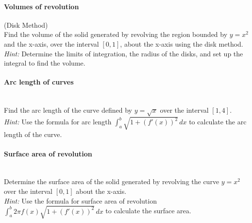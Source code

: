 \documentclass[]{article}
\begin{document}
	\paragraph{Volumes of revolution} (Disk Method)\\
	Find the volume of the solid generated by revolving the region bounded by \(y = x^2\) and the x-axis, over the interval \([0, 1]\), about the x-axis using the disk method.\\
	\textit{Hint:} Determine the limits of integration, the radius of the disks, and set up the integral to find the volume.
	
	\paragraph{Arc length of curves}\mbox{}\\
	Find the arc length of the curve defined by \(y = \sqrt{x}\) over the interval \([1, 4]\).\\
	\textit{Hint:} Use the formula for arc length \(\int_a^b \sqrt{1 + (f'(x))^2} \, dx\) to calculate the arc length of the curve.
	
	\paragraph{Surface area of revolution}\mbox{}\\
	Determine the surface area of the solid generated by revolving the curve \(y = x^2\) over the interval \([0, 1]\) about the x-axis.\\
	\textit{Hint:} Use the formula for surface area of revolution \(\int_a^b 2\pi f(x) \sqrt{1 + (f'(x))^2} \, dx\) to calculate the surface area.
	
	
\end{document}
